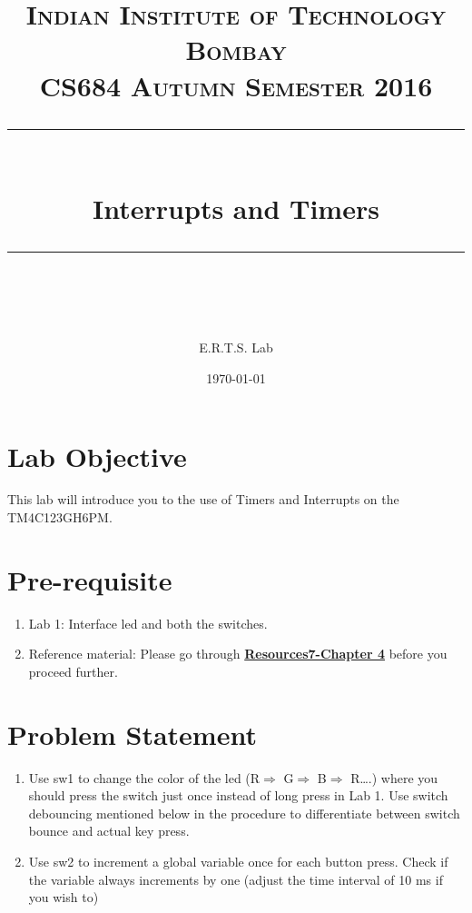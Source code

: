 \documentclass{article} %
\title{
\normalfont \normalsize 
\textsc{Indian Institute of Technology Bombay \\ 
CS684 Autumn Semester 2016} \\
[10pt] 
\rule{\linewidth}{0.5pt} \\[6pt] 
\huge Interrupts and Timers\\
\rule{\linewidth}{2pt}  \\[10pt]
}
\author{E.R.T.S. Lab}
\date{\normalsize \today}
\newcounter{source}
\begin{document}
\maketitle
\noindent

\section{Lab Objective}
This lab will introduce you to the use of Timers and Interrupts on the TM4C123GH6PM.

\section{Pre-requisite}
\begin{enumerate}
\item 
Lab 1: Interface led and both the switches.
\item Reference material: Please go through \href{https://www.cse.iitb.ac.in/~erts/html_pages/Resources/Tiva/TM4C123G_LaunchPad_Workshop_Workbook.pdf}{\textbf{Resources7-Chapter 4}} before you proceed further.

\end{enumerate}


\section{Problem Statement}

\begin{enumerate}
\item 
Use sw1 to change the color of the led (R$\Rightarrow$ G$\Rightarrow$ B$\Rightarrow$ R….) where you should press the switch just once instead of long press in Lab 1. Use switch debouncing mentioned below in the procedure to differentiate between switch bounce and actual key press.
\item
Use sw2 to increment a global variable once for each button press. Check if the variable always increments by one (adjust the time interval of 10 ms if you wish to)
\end{enumerate}
\end{document}

